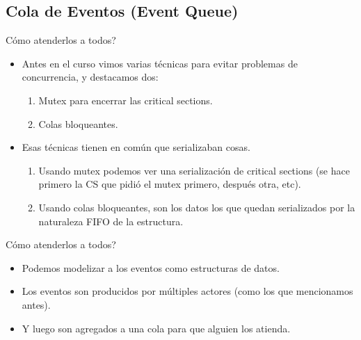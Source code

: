 \subsection{Cola de Eventos (Event Queue)}

\begin{frame}{\textquestiondown C\'omo atenderlos a todos?}{
}
 
  \begin{itemize}

    \item Antes en el curso vimos varias t\'ecnicas para evitar problemas de concurrencia, y destacamos dos:
    \begin{enumerate}
      \item Mutex para encerrar las critical sections.
      \item Colas bloqueantes.
    \end{enumerate}

    \item Esas t\'ecnicas tienen en com\'un que serializaban cosas.
    \begin{enumerate}
      \item Usando mutex podemos ver una serializaci\'on de critical sections (se hace primero la CS que pidi\'o el mutex primero, despu\'es otra, etc).
      \item Usando colas bloqueantes, son los datos los que quedan serializados por la naturaleza FIFO de la estructura.
    \end{enumerate}

  \end{itemize}

\end{frame}

\begin{frame}{\textquestiondown C\'omo atenderlos a todos?}{
}
  \begin{itemize}

    \item Podemos modelizar a los eventos como estructuras de datos.

    \item Los eventos son producidos por m\'ultiples actores (como los que mencionamos antes).

    \item Y luego son agregados a una cola para que alguien los atienda.

  \end{itemize}

\end{frame}

